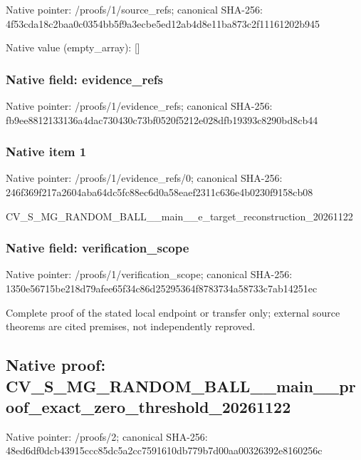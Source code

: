 \documentclass[10pt,a4paper]{article}
\begin{document}
Native pointer: /proofs/1/source\_refs; canonical SHA-256: 4f53cda18c2baa0c0354bb5f\allowbreak{}9a3ecbe5ed12ab4d8e11ba87\allowbreak{}3c2f11161202b945



Native value (empty\_array): []



\subsubsection{Native field: evidence\_refs}


Native pointer: /proofs/1/evidence\_refs; canonical SHA-256: fb9ee8812133136a4dac7304\allowbreak{}30c73bf0520f5212e028dfb1\allowbreak{}9393c8290bd8cb44



\subsubsection{Native item 1}


Native pointer: /proofs/1/evidence\_refs/0; canonical SHA-256: 246f369f217a2604aba64dc5\allowbreak{}fc88ec6d0a58eaef2311c636\allowbreak{}e4b0230f9158cb08


CV\_S\_MG\_RANDOM\_BALL\_\_mai\allowbreak{}n\_\_e\_target\_reconstructi\allowbreak{}on\_20261122


\subsubsection{Native field: verification\_scope}


Native pointer: /proofs/1/verification\_scope; canonical SHA-256: 1350e56715be218d79afee65\allowbreak{}f34c86d25295364f8783734a\allowbreak{}58733c7ab14251ec


Complete proof of the stated local endpoint or transfer only; external source theorems are cited premises, not independently reproved.


\subsection{Native proof: CV\_S\_MG\_RANDOM\_BALL\_\_mai\allowbreak{}n\_\_proof\_exact\_zero\_thre\allowbreak{}shold\_20261122}


Native pointer: /proofs/2; canonical SHA-256: 48ed6df0dcb43915ccc85dc5\allowbreak{}a2cc7591610db779b7d00aa0\allowbreak{}0326392e8160256c
\end{document}
